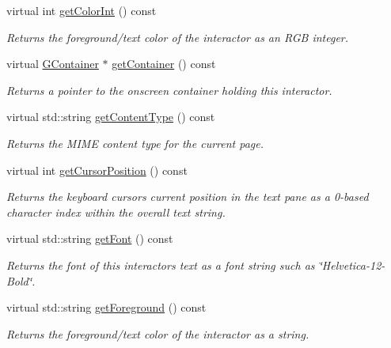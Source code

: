 \begin{DoxyCompactItemize}
virtual int \mbox{\hyperlink{classGInteractor_a9635c7af766cdc3417f346683fa0e6c1}{get\+Color\+Int}} () const
\begin{DoxyCompactList}\small\item\em Returns the foreground/text color of the interactor as an R\+GB integer. \end{DoxyCompactList}\item 
virtual \mbox{\hyperlink{classGContainer}{G\+Container}} $\ast$ \mbox{\hyperlink{classGInteractor_a7a6e317c29d61030929b4cd2d1c00fe7}{get\+Container}} () const
\begin{DoxyCompactList}\small\item\em Returns a pointer to the onscreen container holding this interactor. \end{DoxyCompactList}\item 
virtual std\+::string \mbox{\hyperlink{classGBrowserPane_af3bc7daeceb5c8abfb8edaa1941e3757}{get\+Content\+Type}} () const
\begin{DoxyCompactList}\small\item\em Returns the M\+I\+ME content type for the current page. \end{DoxyCompactList}\item 
virtual int \mbox{\hyperlink{classGBrowserPane_aa85d2267b4534eb372cd3114ea61ba3b}{get\+Cursor\+Position}} () const
\begin{DoxyCompactList}\small\item\em Returns the keyboard cursor\textquotesingle{}s current position in the text pane as a 0-\/based character index within the overall text string. \end{DoxyCompactList}\item 
virtual std\+::string \mbox{\hyperlink{classGInteractor_a894a5502900794eeb27d084c21f1d77d}{get\+Font}} () const
\begin{DoxyCompactList}\small\item\em Returns the font of this interactor\textquotesingle{}s text as a font string such as \char`\"{}\+Helvetica-\/12-\/\+Bold\char`\"{}. \end{DoxyCompactList}\item 
virtual std\+::string \mbox{\hyperlink{classGInteractor_a4fa2d8b0192a3a5b4af4bbfe71194d03}{get\+Foreground}} () const
\begin{DoxyCompactList}\small\item\em Returns the foreground/text color of the interactor as a string. \end{DoxyCompactList}\item 

\end{DoxyCompactItemize}

